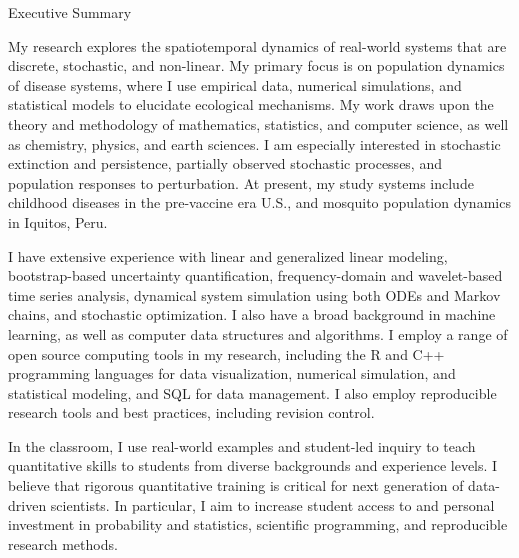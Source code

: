 \documentclass{resume} %
\begin{document}


\begin{rSection}{Executive Summary}
\item 
My research explores the spatiotemporal dynamics of
real-world systems that are discrete, stochastic, and
non-linear.  My primary focus is on population dynamics of
disease systems, where I use empirical data, numerical
simulations, and statistical models to elucidate ecological
mechanisms. My work draws upon the theory and methodology of
mathematics, statistics, and computer science, as well as
chemistry, physics, and earth sciences. I am especially
interested in stochastic extinction and persistence,
partially observed stochastic processes, and population
responses to perturbation. At present, my study systems
include childhood diseases in the pre-vaccine era U.S., and
mosquito population dynamics in Iquitos, Peru.

\item I have extensive experience with linear and
generalized linear modeling, bootstrap-based uncertainty
quantification, frequency-domain and wavelet-based time
series analysis, dynamical system simulation using both ODEs
and Markov chains, and stochastic optimization. I also have
a broad background in machine learning, as well as computer
data structures and algorithms.  I employ a range of open
source computing tools in my research, including the R and
C++ programming languages for data visualization, numerical
simulation, and statistical modeling, and SQL for data
management.  I also employ reproducible research tools and
best practices, including revision control.

\item In the classroom, I use real-world examples and
student-led inquiry to teach quantitative skills to students
from diverse backgrounds and experience levels. I believe
that rigorous quantitative training is critical for next
generation of data-driven scientists. In particular, I aim
to increase student access to and personal investment in
probability and statistics, scientific programming, and
reproducible research methods.

\end{rSection}
\end{document}
